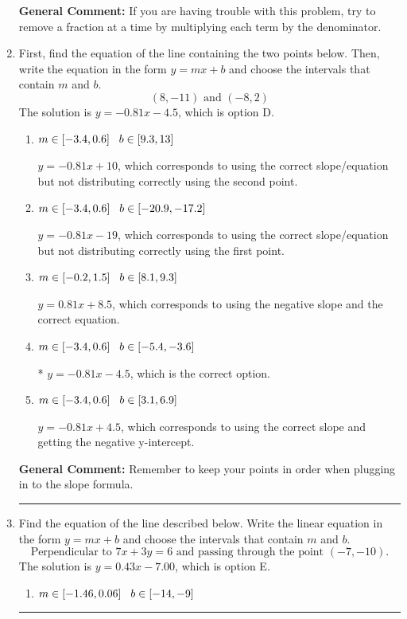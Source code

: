 \documentclass{extbook}[14pt]
\newcommand{\litem}[1]{\item #1

\rule{\textwidth}{0.4pt}}
\begin{document}
\begin{enumerate}
{\textbf{General Comment:} If you are having trouble with this problem, try to remove a fraction at a time by multiplying each term by the denominator.
}
\litem{
First, find the equation of the line containing the two points below. Then, write the equation in the form $ y=mx+b $ and choose the intervals that contain $m$ and $b$.
\[ (8, -11) \text{ and } (-8, 2) \]The solution is \( y = -0.81x -4.5 \), which is option D.\begin{enumerate}[label=\Alph*.]
\item \( m \in [-3.4, 0.6] \hspace*{3mm} b \in [9.3, 13] \)

 $y = -0.81x + 10$, which corresponds to using the correct slope/equation but not distributing correctly using the second point.
\item \( m \in [-3.4, 0.6] \hspace*{3mm} b \in [-20.9, -17.2] \)

 $y = -0.81x -19$, which corresponds to using the correct slope/equation but not distributing correctly using the first point.
\item \( m \in [-0.2, 1.5] \hspace*{3mm} b \in [8.1, 9.3] \)

 $y = 0.81x + 8.5$, which corresponds to using the negative slope and the correct equation.
\item \( m \in [-3.4, 0.6] \hspace*{3mm} b \in [-5.4, -3.6] \)

* $y = -0.81x -4.5$, which is the correct option.
\item \( m \in [-3.4, 0.6] \hspace*{3mm} b \in [3.1, 6.9] \)

 $y = -0.81x + 4.5$, which corresponds to using the correct slope and getting the negative y-intercept.
\end{enumerate}

\textbf{General Comment:} Remember to keep your points in order when plugging in to the slope formula.
}
\litem{
Find the equation of the line described below. Write the linear equation in the form $ y=mx+b $ and choose the intervals that contain $m$ and $b$.
\[ \text{Perpendicular to } 7 x + 3 y = 6 \text{ and passing through the point } (-7, -10). \]The solution is \( y = 0.43x - 7.00 \), which is option E.\begin{enumerate}[label=\Alph*.]
\item \( m \in [-1.46, 0.06] \hspace*{3mm} b \in [-14, -9] \)


\end{enumerate}}
\end{enumerate}
\end{document}
